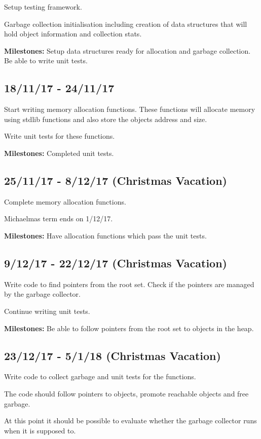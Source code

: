\documentclass[12pt, a4]{article}
\begin{document}
Setup testing framework.

Garbage collection initialisation including creation of data structures that will hold object information and collection stats.

{\bf Milestones:} Setup data structures ready for allocation and garbage collection. Be able to write unit tests.

\subsection*{18/11/17 - 24/11/17}

Start writing memory allocation functions. These functions will allocate memory using stdlib functions and also store the objects address and size.

Write unit tests for these functions.

{\bf Milestones:} Completed unit tests.

\subsection*{25/11/17 - 8/12/17 (Christmas Vacation)}

Complete memory allocation functions.

Michaelmas term ends on 1/12/17.

{\bf Milestones:} Have allocation functions which pass the unit tests.

\subsection*{9/12/17 - 22/12/17 (Christmas Vacation)}

Write code to find pointers from the root set. Check if the pointers are managed by the garbage collector.

Continue writing unit tests.

{\bf Milestones:} Be able to follow pointers from the root set to objects in the heap.

\subsection*{23/12/17 - 5/1/18 (Christmas Vacation)}

Write code to collect garbage and unit tests for the functions. 

The code should follow pointers to objects, promote reachable objects and free garbage.

At this point it should be possible to evaluate whether the garbage collector runs when it is supposed to.
\end{document}
